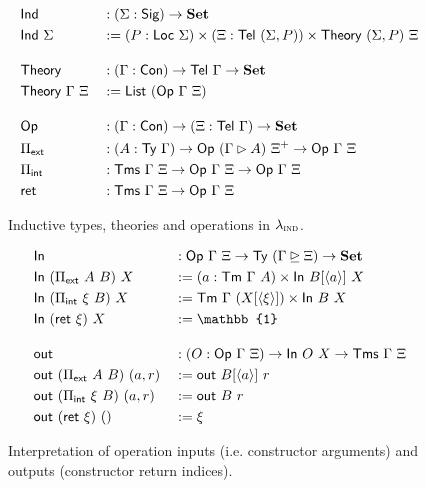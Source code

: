 \begin{figure}[H]
  \begin{alignat*}{2}
  & \Ind &&: (\Sigma : \Sig) \to \Set \\
  & \Ind\ \Sigma &&:= (P : \Loc\ \Sigma) \times (\Xi : \Tel\ (\Sigma, P)) \times \Theory\ (\Sigma, P)\ \Xi \\[1em]
  & \Theory &&: (\Gamma : \Con) \to \Tel\ \Gamma \to \Set \\
  & \Theory\ \Gamma\ \Xi &&:= \mta{List}\ (\Op\ \Gamma\ \Xi) \\[1em]
  & \Op &&: (\Gamma : \Con) \to (\Xi : \Tel\ \Gamma) \to \Set \\
  & \Pi_{\mta{ext}} &&: (A : \Ty\ \Gamma) \to \Op\ (\Gamma \rhd A)\ \Xi^+ \to \Op\ \Gamma\ \Xi \\
  & \Pi_{\mta{int}} &&: \Tms\ \Gamma\ \Xi \to \Op\ \Gamma\ \Xi \to \Op\ \Gamma\ \Xi \\
  & \mta{ret} &&: \Tms\ \Gamma\ \Xi \to \Op\ \Gamma\ \Xi
  \end{alignat*}
  \caption{Inductive types, theories and operations in $\lambda_{\textsc{ind}}$.}
  \label{fig:lambdaind-inductive-theories}
\end{figure}

\begin{figure}[H]
  \begin{alignat*}{2}
  &\mta{In} &&: \Op\ \Gamma\ \Xi \to \Ty\ (\Gamma \unrhd \Xi) \to \Set \\
  &\mta{In}\ (\Pi_{\mta{ext}}\ A\ B)\ X &&:= (a : \Tm\ \Gamma\ A) \times \mta{In}\ B [\langle a \rangle]\ X \\
  &\mta{In}\ (\Pi_{\mta{int}}\ \xi\ B)\ X &&:= \Tm\ \Gamma\ (X [\langle \xi \rangle]) \times \mta{In}\ B\ X \\
  &\mta{In}\ (\mta{ret}\ \xi)\ X &&:= \mathbb{1} \\[1em]
  &\mta{out} &&: (O : \Op\ \Gamma\ \Xi) \to \mta{In}\ O\ X \to \Tms\ \Gamma\ \Xi \\
  &\mta{out}\ (\Pi_{\mta{ext}}\ A\ B)\ (a, r) &&:= \mta{out}\ B[\langle a \rangle]\ r \\
  &\mta{out}\ (\Pi_{\mta{int}}\ \xi\ B)\ (a, r) &&:= \mta{out}\ B\ r \\
  &\mta{out}\ (\mta{ret}\ \xi)\ () &&:= \xi
  \end{alignat*}
  \caption{Interpretation of operation inputs (i.e. constructor arguments) and outputs (constructor return indices).}
  \label{fig:lambdaind-operation-interp}
\end{figure}

